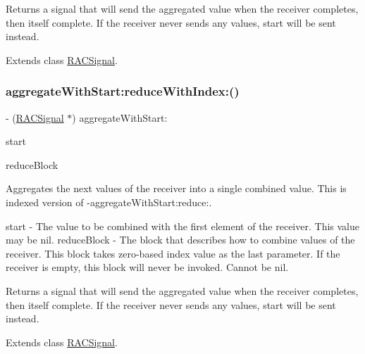 Returns a signal that will send the aggregated value when the receiver completes, then itself complete. If the receiver never sends any values, {\ttfamily start} will be sent instead. 

Extends class \mbox{\hyperlink{interface_r_a_c_signal_a83c6fc367091505aa6721f1c6a58d65d}{R\+A\+C\+Signal}}.

\mbox{\label{category_r_a_c_signal_07_operations_08_a83c6fc367091505aa6721f1c6a58d65d}} 
\subsubsection{\texorpdfstring{aggregate\+With\+Start\+:reduce\+With\+Index\+:()}{aggregateWithStart:reduceWithIndex:()}\hspace{0.1cm}{\footnotesize\ttfamily [2/3]}}
{\footnotesize\ttfamily -\/ (\mbox{\hyperlink{interface_r_a_c_signal}{R\+A\+C\+Signal}} $\ast$) aggregate\+With\+Start\+: \begin{DoxyParamCaption}\item[{(id)}]{start }\item[{reduceWithIndex:(id($^\wedge$)(id running, id next, N\+S\+U\+Integer index))}]{reduce\+Block }\end{DoxyParamCaption}}

Aggregates the {\ttfamily next} values of the receiver into a single combined value. This is indexed version of -\/aggregate\+With\+Start\+:reduce\+:.

start -\/ The value to be combined with the first element of the receiver. This value may be {\ttfamily nil}. reduce\+Block -\/ The block that describes how to combine values of the receiver. This block takes zero-\/based index value as the last parameter. If the receiver is empty, this block will never be invoked. Cannot be nil.

Returns a signal that will send the aggregated value when the receiver completes, then itself complete. If the receiver never sends any values, {\ttfamily start} will be sent instead. 

Extends class \mbox{\hyperlink{interface_r_a_c_signal_a83c6fc367091505aa6721f1c6a58d65d}{R\+A\+C\+Signal}}.

